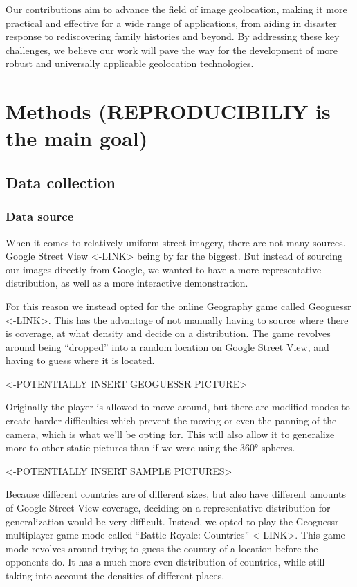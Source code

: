 Our contributions aim to advance the field of image geolocation, making
it more practical and effective for a wide range of applications, from
aiding in disaster response to rediscovering family histories and
beyond. By addressing these key challenges, we believe our work will
pave the way for the development of more robust and universally
applicable geolocation technologies.

\section{Methods (REPRODUCIBILIY is the main
goal)}\label{methods-reproducibiliy-is-the-main-goal}

\subsection{Data collection}\label{data-collection}

\subsubsection{Data source}\label{data-source}

When it comes to relatively uniform street imagery, there are not many
sources. Google Street View \textless-LINK\textgreater{} being by far
the biggest. But instead of sourcing our images directly from Google, we
wanted to have a more representative distribution, as well as a more
interactive demonstration.

For this reason we instead opted for the online Geography game called
Geoguessr \textless-LINK\textgreater. This has the advantage of not
manually having to source where there is coverage, at what density and
decide on a distribution. The game revolves around being ``dropped''
into a random location on Google Street View, and having to guess where
it is located.

\textless-POTENTIALLY INSERT GEOGUESSR PICTURE\textgreater{}

Originally the player is allowed to move around, but there are modified
modes to create harder difficulties which prevent the moving or even the
panning of the camera, which is what we'll be opting for. This will also
allow it to generalize more to other static pictures than if we were
using the 360° spheres.

\textless-POTENTIALLY INSERT SAMPLE PICTURES\textgreater{}

Because different countries are of different sizes, but also have
different amounts of Google Street View coverage, deciding on a
representative distribution for generalization would be very difficult.
Instead, we opted to play the Geoguessr multiplayer game mode called
``Battle Royale: Countries'' \textless-LINK\textgreater. This game mode
revolves around trying to guess the country of a location before the
opponents do. It has a much more even distribution of countries, while
still taking into account the densities of different places.

